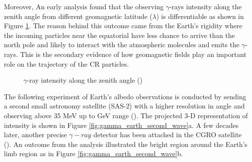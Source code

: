 Moreover, An early analysis found 
that the observing $\gamma$-rays intensity along the zenith angle
from different geomagnetic latitude ($\lambda$) is differentiable
as shown in Figure \ref{fig:explorer_xi_zenith}. The reason behind 
this outcome came from the Earth's rigidity where the incoming 
particles near the equatorial have less chance to arrive than the 
north pole and likely to interact with the atmospheric molecules 
and emits the $\gamma$-rays. This is the secondary 
evidence of how geomagnetic fields play an important role on the 
trajectory of the CR particles. 

\begin{figure}[h!]
    \centering
        \hfill
        \caption{
            $\gamma$-ray intensity along the zenith angle
            (\cite{kraushaar1965explorer})  
        }
       \label{fig:explorer_xi_zenith}
\end{figure}

The following experiment of Earth's albedo observations is conducted 
by sending a second small astronomy satellite (SAS-2) with a higher 
resolution in angle and observing above 35 MeV up to GeV range
(\cite{Thompson81}). The projected 3-D representation of intensity
is shown in Figure \ref{fig:gamma_earth_second_wave}a. A few decades 
later, another precise $\gamma-ray$ detector has been attached in the 
CGRO satellite (\cite{Petry05}). An outcome from the analysis illustrated the bright region around the Earth's limb region as 
in Figure \ref{fig:gamma_earth_second_wave}b.


